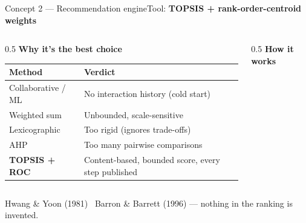 \documentclass[aspectratio=169,11pt]{beamer}
\newcommand{\tool}[1]{{\color{accentdk}\bfseries #1}}
\newcommand{\hd}[1]{\cellcolor{ink}\color{white}\bfseries #1}
\begin{document}
\begin{frame}{Concept 2 — Recommendation engine}{Tool: \tool{TOPSIS + rank-order-centroid weights}}
\begin{columns}[T]
\begin{column}{0.5\textwidth}
  {\color{ink}\bfseries\small Why it's the best choice}\\[4pt]
  {\scriptsize
  \renewcommand{\arraystretch}{1.25}
  \begin{tabular}{@{}p{2.5cm} p{4.0cm}@{}}
  \toprule
  \rowcolor{ink}\hd{Method} & \hd{Verdict} \\
  \midrule
  Collaborative / ML & No interaction history (cold start) \\
  Weighted sum & Unbounded, scale-sensitive \\
  Lexicographic & Too rigid (ignores trade-offs) \\
  AHP & Too many pairwise comparisons \\
  \rowcolor{accentlt}\color{accentdk}\bfseries TOPSIS + ROC & \color{accentdk}Content-based, bounded score, every step published \\
  \bottomrule
  \end{tabular}}
\end{column}
\begin{column}{0.5\textwidth}
  {\color{ink}\bfseries\small How it works}\\[6pt]
  \centering
\end{column}
\end{columns}
\vspace{1pt}
{\color{muted}\scriptsize Hwang \& Yoon (1981) \textbullet\ Barron \& Barrett (1996) — nothing in the ranking is invented.}
\end{frame}
\end{document}
